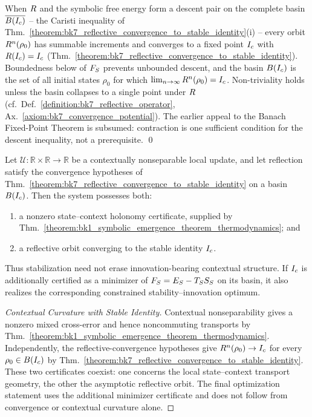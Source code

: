 \begin{demonstratio}
\label{demonstratio:bk7_banach_convergence_reflection}
When \(R\) and the symbolic free energy form a descent pair on the complete basin \(\overline{B(I_c)}\) -- the Caristi inequality of Thm.~\ref{theorem:bk7_reflective_convergence_to_stable_identity}(i) -- every orbit \(R^n(\rho_0)\) has summable increments and converges to a fixed point \(I_c\) with \(R(I_c)=I_c\) (Thm.~\ref{theorem:bk7_reflective_convergence_to_stable_identity}). Boundedness below of \(F_S\) prevents unbounded descent, and the basin \(B(I_c)\) is the set of all initial states \(\rho_0\) for which \(\lim_{n\to\infty}R^n(\rho_0)=I_c\). Non-triviality holds unless the basin collapses to a single point under \(R\) (cf.~Def.~\ref{definition:bk7_reflective_operator}, Ax.~\ref{axiom:bk7_convergence_potential}). The earlier appeal to the Banach Fixed-Point Theorem is subsumed: contraction is one sufficient condition for the descent inequality, not a prerequisite. \qed
\end{demonstratio}
\begin{corollary}
\label{corollary:bk7_stability_innovation_equilibrium}
Let $\mathcal{U}:\mathbb{R}\times\mathbb{R}\to\mathbb{R}$ be a contextually
nonseparable local update, and let reflection satisfy the convergence
hypotheses of Thm.~\ref{theorem:bk7_reflective_convergence_to_stable_identity}
on a basin $B(I_c)$. Then the system possesses both:
\begin{enumerate}
  \item a nonzero state--context holonomy certificate, supplied by
  Thm.~\ref{theorem:bk1_symbolic_emergence_theorem_thermodynamics}; and
  \item a reflective orbit converging to the stable identity $I_c$.
\end{enumerate}
Thus stabilization need not erase innovation-bearing contextual structure.
If $I_c$ is additionally certified as a minimizer of
$F_S=E_S-T_SS_S$ on its basin, it also realizes the
corresponding constrained stability--innovation optimum.
\end{corollary}
\begin{proof}[Contextual Curvature with Stable Identity]
\label{proof:bk7_stability_innovation_equilibrium}
\leavevmode
Contextual nonseparability gives a nonzero mixed cross-error and hence
noncommuting transports by
Thm.~\ref{theorem:bk1_symbolic_emergence_theorem_thermodynamics}. Independently,
the reflective-convergence hypotheses give
$R^n(\rho_0)\to I_c$ for every $\rho_0\in B(I_c)$ by
Thm.~\ref{theorem:bk7_reflective_convergence_to_stable_identity}. These two
certificates coexist: one concerns the local state--context transport geometry,
the other the asymptotic reflective orbit. The final optimization statement
uses the additional minimizer certificate and does not follow from convergence
or contextual curvature alone.
\end{proof}
